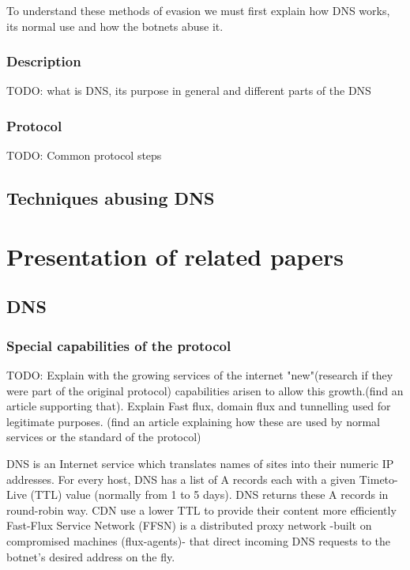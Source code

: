 To understand these methods of evasion we must first explain how DNS works, its normal use and how the botnets abuse it.
\subsubsection{Description}
TODO: what is DNS, its purpose in general and different parts of the DNS
\subsubsection{Protocol}
TODO: Common protocol steps

\subsection{Techniques abusing DNS}
\section{Presentation of related papers}

\subsection{DNS}

\subsubsection{Special capabilities of the protocol}
TODO: Explain with the growing services of the internet "new"(research if they were part of the original protocol) capabilities arisen to allow this growth.(find an article supporting that). 
Explain Fast flux, domain flux and tunnelling used for legitimate purposes.
(find an article explaining how these are used by normal services or the standard of the protocol)

DNS is an Internet service which translates names of sites into their numeric IP addresses. For
every host, DNS has a list of A records each with a given Timeto- Live (TTL) value (normally from 1
to 5 days). DNS returns these A records in round-robin way.
CDN use a lower TTL to provide their content more efficiently
Fast-Flux Service Network (FFSN) is a distributed proxy network -built on compromised machines
(flux-agents)- that direct incoming DNS requests to the botnet’s desired address on the fly.

